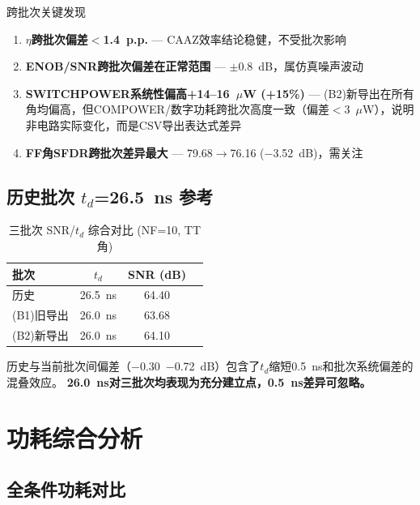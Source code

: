 \documentclass[11pt,a4paper,UTF8]{ctexart}
\begin{document}
\begin{databox}{跨批次关键发现}
\begin{enumerate}
  \item \textbf{$\eta$跨批次偏差$<$1.4~p.p.} --- CAAZ效率结论稳健，不受批次影响
  \item \textbf{ENOB/SNR跨批次偏差在正常范围} --- $\pm$0.8~dB，属仿真噪声波动
  \item \textbf{SWITCHPOWER系统性偏高+14--16~$\mu$W (+15\%)} --- (B2)新导出在所有角均偏高，但COMPOWER/数字功耗跨批次高度一致（偏差$<$3~$\mu$W），说明非电路实际变化，而是CSV导出表达式差异
  \item \textbf{FF角SFDR跨批次差异最大} --- 79.68$\rightarrow$76.16 ($-$3.52~dB)，需关注
\end{enumerate}
\end{databox}

\subsection{历史批次 $t_d$=26.5~ns 参考}

\begin{table}[htbp]
\centering
\caption{三批次 SNR/$t_d$ 综合对比 (NF=10, TT角)}
\label{tab:three-batch}
\begin{tabular}{lccc}
\toprule
\textbf{批次} & \textbf{$t_d$} & \textbf{SNR (dB)} \\
\midrule
历史 & 26.5~ns & 64.40 \\
(B1)旧导出 & 26.0~ns & 63.68 \\
(B2)新导出 & 26.0~ns & 64.10 \\
\bottomrule
\end{tabular}
\end{table}

历史与当前批次间偏差（$-$0.30~$-$0.72~dB）包含了$t_d$缩短0.5~ns和批次系统偏差的混叠效应。
\textbf{26.0~ns对三批次均表现为充分建立点，0.5~ns差异可忽略。}

\section{功耗综合分析}
\label{sec:power}

\subsection{全条件功耗对比}
\end{document}
